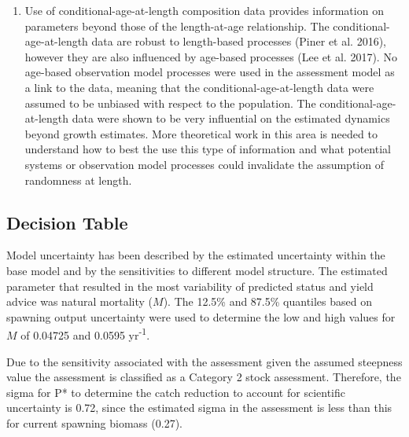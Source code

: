\documentclass[12pt,]{article}
\begin{document}
\begin{enumerate}
\item Use of conditional-age-at-length composition data provides information on parameters beyond those of the length-at-age relationship. The conditional-age-at-length data are robust to length-based processes (Piner et al. 2016), however they are also influenced by age-based processes (Lee et al. 2017). No age-based observation model processes were used in the assessment model as a link to the data, meaning that the conditional-age-at-length data were assumed to be unbiased with respect to the population. The conditional-age-at-length data were shown to be very influential on the estimated dynamics beyond growth estimates. More theoretical work in this area is needed to understand how to best the use this type of information and what potential systems or observation model processes could invalidate the assumption of randomness at length.

\end{enumerate}

\subsection*{Decision Table}\label{decision-table}

Model uncertainty has been described by the estimated uncertainty within
the base model and by the sensitivities to different model structure.
The estimated parameter that resulted in the most variability of
predicted status and yield advice was natural mortality (\(M\)). The
12.5\% and 87.5\% quantiles based on spawning output uncertainty were
used to determine the low and high values for \(M\) of 0.04725 and
0.0595 yr\textsuperscript{-1}.

Due to the sensitivity associated with the assessment given the assumed
steepness value the assessment is classified as a Category 2 stock
assessment. Therefore, the sigma for P* to determine the catch reduction
to account for scientific uncertainty is 0.72, since the estimated sigma
in the assessment is less than this for current spawning biomass (0.27).
\end{document}
